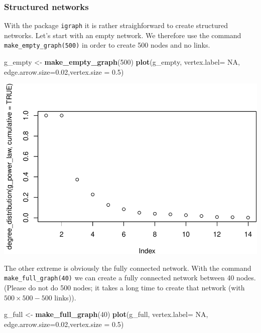 \documentclass[]{article}
\newenvironment{Shaded}{\begin{snugshade}}{\end{snugshade}}
\newcommand{\KeywordTok}[1]{\textcolor[rgb]{0.13,0.29,0.53}{\textbf{#1}}}
\newcommand{\DataTypeTok}[1]{\textcolor[rgb]{0.13,0.29,0.53}{#1}}
\newcommand{\DecValTok}[1]{\textcolor[rgb]{0.00,0.00,0.81}{#1}}
\newcommand{\FloatTok}[1]{\textcolor[rgb]{0.00,0.00,0.81}{#1}}
\newcommand{\StringTok}[1]{\textcolor[rgb]{0.31,0.60,0.02}{#1}}
\newcommand{\OtherTok}[1]{\textcolor[rgb]{0.56,0.35,0.01}{#1}}
\newcommand{\NormalTok}[1]{#1}
\theoremstyle{definition}
\theoremstyle{definition}
\theoremstyle{definition}
\theoremstyle{remark}
\begin{document}
\subsubsection{Structured networks}\label{structured-networks}

With the package \texttt{igraph} it is rather straighforward to create
structured networks. Let's start with an empty network. We therefore use
the command \texttt{make\_empty\_graph(500)} in order to create 500
nodes and no links.

\begin{Shaded}
\begin{Highlighting}[]
\NormalTok{g_empty <-}\StringTok{ }\KeywordTok{make_empty_graph}\NormalTok{(}\DecValTok{500}\NormalTok{)}
\KeywordTok{plot}\NormalTok{(g_empty, }\DataTypeTok{vertex.label=} \OtherTok{NA}\NormalTok{, }\DataTypeTok{edge.arrow.size=}\FloatTok{0.02}\NormalTok{,}\DataTypeTok{vertex.size =} \FloatTok{0.5}\NormalTok{)}
\end{Highlighting}
\end{Shaded}

\includegraphics{ResearchTools_files/figure-latex/unnamed-chunk-59-1.pdf}

The other extreme is obviously the fully connected network. With the
command \texttt{make\_full\_graph(40)} we can create a fully connected
network between 40 nodes. (Please do not do 500 nodes; it takes a long
time to create that network (with \(500 \times 500 - 500\) links)).

\begin{Shaded}
\begin{Highlighting}[]
\NormalTok{g_full <-}\StringTok{ }\KeywordTok{make_full_graph}\NormalTok{(}\DecValTok{40}\NormalTok{)}
\KeywordTok{plot}\NormalTok{(g_full, }\DataTypeTok{vertex.label=} \OtherTok{NA}\NormalTok{, }\DataTypeTok{edge.arrow.size=}\FloatTok{0.02}\NormalTok{,}\DataTypeTok{vertex.size =} \FloatTok{0.5}\NormalTok{)}
\end{Highlighting}
\end{Shaded}
\end{document}

